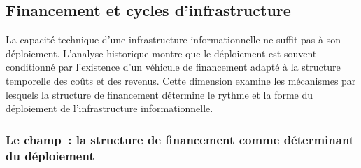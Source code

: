 
\clearpage
\subsection{Financement et cycles d'infrastructure}\label{sec:d8-finance}

La capacité technique d'une infrastructure informationnelle ne suffit pas à son déploiement. L'analyse historique montre que le déploiement est souvent conditionné par l'existence d'un véhicule de financement adapté à la structure temporelle des coûts et des revenus. Cette dimension examine les mécanismes par lesquels la structure de financement détermine le rythme et la forme du déploiement de l'infrastructure informationnelle.

\subsubsection{Le champ~: la structure de financement comme déterminant du déploiement}

